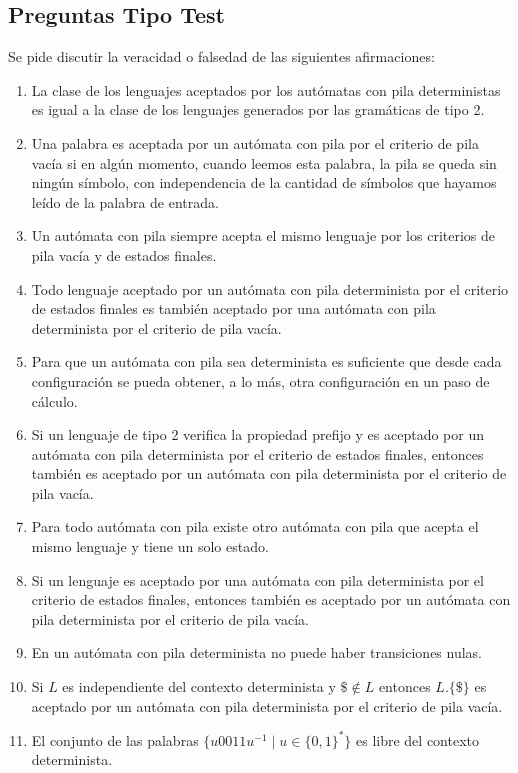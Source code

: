 \subsection{Preguntas Tipo Test}
Se pide discutir la veracidad o falsedad de las siguientes afirmaciones:
\begin{enumerate}
    \item La clase de los lenguajes aceptados por los autómatas con pila deterministas es igual a la clase de los lenguajes generados por las gramáticas de tipo 2.
    \item Una palabra es aceptada por un autómata con pila por el criterio de pila vacía si en algún momento, cuando leemos esta palabra, la pila se queda sin ningún símbolo, con independencia de la cantidad de símbolos que hayamos leído de la palabra de entrada.
    \item Un autómata con pila siempre acepta el mismo lenguaje por los criterios de pila vacía y de estados finales.
    \item Todo lenguaje aceptado por un autómata con pila determinista por el criterio de estados finales es también aceptado por una autómata con pila determinista por el criterio de pila vacía.
    \item Para que un autómata con pila sea determinista es suficiente que desde cada configuración se pueda obtener, a lo más, otra configuración en un paso de cálculo.
    \item Si un lenguaje de tipo 2 verifica la propiedad prefijo y es aceptado por un autómata con pila determinista por el criterio de estados finales, entonces también es aceptado por un autómata con pila determinista por el criterio de pila vacía.
    \item Para todo autómata con pila existe otro autómata con pila que acepta el mismo lenguaje y tiene un solo estado.
    \item Si un lenguaje es aceptado por una autómata con pila determinista por el criterio de estados finales, entonces también es aceptado por un autómata con pila determinista por el criterio de pila vacía.
    \item En un autómata con pila determinista no puede haber transiciones nulas.
    \item Si $L$ es independiente del contexto determinista y $\$ \notin L$ entonces $L.\{\$\}$ es aceptado por un autómata con pila determinista por el criterio de pila vacía.
    \item El conjunto de las palabras $\{u0011u^{-1}\mid u\in {\{0,1\}}^{\ast}\}$ es libre del contexto determinista.

\end{enumerate}
